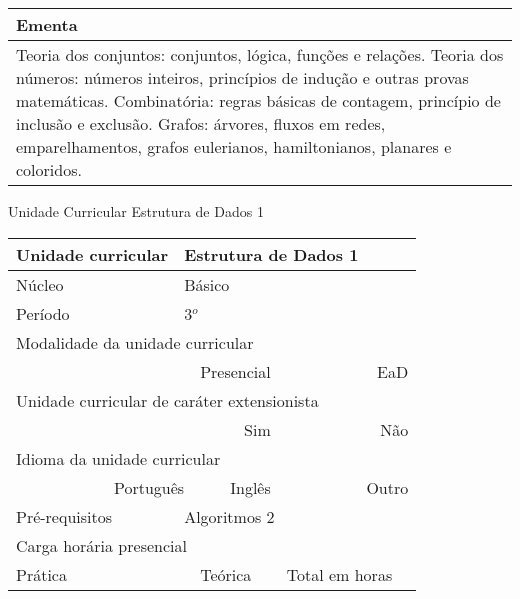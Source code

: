 \begin{quadro}[ht!]
\begin{tabular}{|p{3cm} p{2cm} p{3cm} p{2cm} p{3cm} p{2cm}|}
\multicolumn{6}{|p{15cm}|}{\cellcolor{blue1} Ementa} \\\hline
\hline\multicolumn{6}{|p{15cm}|}{\scriptsize Teoria dos conjuntos: conjuntos, lógica, funções e relações. Teoria dos números: números inteiros, princípios de indução e outras provas matemáticas. Combinatória: regras básicas de contagem, princípio de inclusão e exclusão. Grafos: árvores, fluxos em redes, emparelhamentos, grafos eulerianos, hamiltonianos, planares e coloridos.}\\\hline
\hline
	\end{tabular}
\end{quadro}
\clearpage
\newpage\begin{quadro}[ht!]
  \centering\scriptsize
\caption{Unidade Curricular Estrutura de Dados 1}
\label{ unit_12 }
\begin{tabular}{|p{3cm} p{2cm} p{3cm} p{2cm} p{3cm} p{2cm}|}\hline
\multicolumn{1}{|p{3cm}|}{\cellcolor{blue1} Unidade curricular} & \multicolumn{5}{p{9cm}|}{ Estrutura de Dados 1 }\\\hline
\multicolumn{1}{|p{3cm}|}{\cellcolor{blue1} Núcleo} & \multicolumn{5}{p{11.5cm}|}{ Básico }\\\hline
\multicolumn{1}{|p{3cm}|}{\cellcolor{blue1} Período} & \multicolumn{5}{p{9cm}|}{ 3$^o$ }\\\hline
\multicolumn{6}{|p{15cm}|}{\cellcolor{blue1} Modalidade da unidade curricular} \\\hline
\multicolumn{2}{|r}{		} &  \multicolumn{2}{r}{Presencial \XBox } & \multicolumn{2}{r|}{EaD \Square	} \\\hline
\multicolumn{6}{|p{15cm}|}{\cellcolor{blue1} Unidade curricular de caráter extensionista} \\\hline
\multicolumn{4}{|r}{			Sim \Square	} & \multicolumn{2}{r|}{	Não \XBox	}\\\hline
\multicolumn{6}{|p{15cm}|}{\cellcolor{blue1} Idioma da unidade curricular} \\ \hline
\multicolumn{2}{|r}{	Português \XBox	} &  \multicolumn{2}{r}{	Inglês \Square	} & \multicolumn{2}{r|}{	Outro \Square	} \\ \hline
\multicolumn{1}{|p{3cm}|}{\cellcolor{blue1} Pré-requisitos} & \multicolumn{5}{p{9cm}|}{ Algoritmos 2 }\\ \hline
\multicolumn{6}{|p{15cm}|}{\cellcolor{blue1} Carga horária presencial} \\ \hline
\multicolumn{1}{|p{3cm}|}{\raggedleft Prática} & \multicolumn{1}{p{1cm}|}{\centering	30	} &  \multicolumn{1}{p{3cm}|}{\raggedleft Teórica}  & \multicolumn{1}{p{1cm}|}{\centering 	30 } & \multicolumn{1}{p{3cm}|}{\raggedleft Total em horas} & \multicolumn{1}{p{1cm}|}{\raggedleft	60	} \\ \hline

\end{tabular}
\end{quadro}
